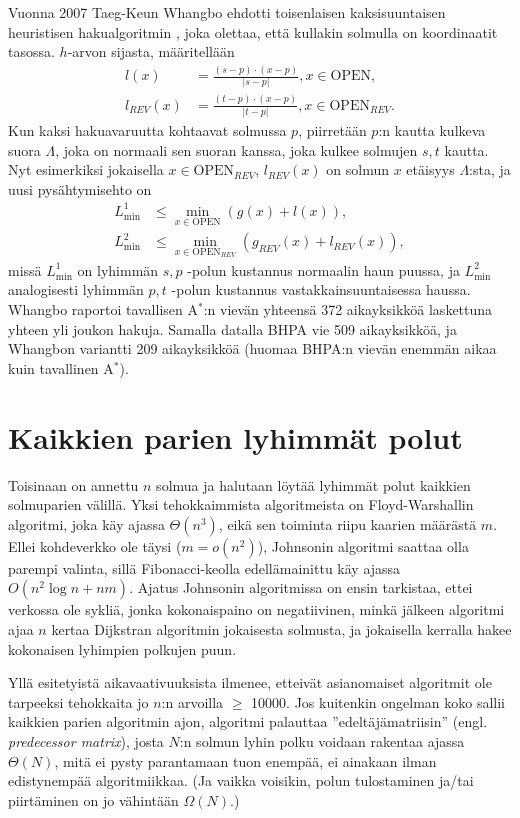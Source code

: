 \documentclass[finnish]{tktltiki2}
\theoremstyle{definition}
\theoremstyle{remark}
\begin{document}
Vuonna 2007 Taeg-Keun Whangbo ehdotti toisenlaisen kaksisuuntaisen heuristisen hakualgoritmin \cite{Whangbo07}, joka olettaa, että kullakin solmulla on koordinaatit tasossa. $h$-arvon sijasta, määritellään
\begin{align*}
l(x) &= \frac{(s - p) \cdot (x - p)}{ | s - p | }, x \in \text{OPEN}, \\
l_{REV}(x) &= \frac{(t - p) \cdot (x - p)}{ | t - p | }, x \in \text{OPEN}_{REV}.
\end{align*}
Kun kaksi hakuavaruutta kohtaavat solmussa $p$, piirretään $p$:n kautta kulkeva suora $\Lambda$, joka on normaali sen suoran kanssa, joka kulkee solmujen $s, t$ kautta. Nyt esimerkiksi jokaisella $x \in \text{OPEN}_{REV}$, $l_{REV}(x)$ on solmun $x$ etäisyys $\Lambda$:sta, ja uusi pysähtymisehto on
\begin{align*}
L^1_{\min} & \leq \underset{x \in \text{OPEN}}{\min} (g(x) + l(x)), \\
L^2_{\min} & \leq \underset{x \in \text{OPEN}_{REV}}{\min} (g_{REV}(x) + l_{REV}(x)),
\end{align*}
missä $L_{\min}^1$ on lyhimmän $s, p$ -polun kustannus normaalin haun puussa, ja $L_{\min}^2$ analogisesti lyhimmän $p, t$ -polun kustannus vastakkainsuuntaisessa haussa. Whangbo raportoi tavallisen A$^{\ast}$:n vievän yhteensä 372 aikayksikköä laskettuna yhteen yli joukon hakuja. Samalla datalla BHPA vie 509 aikayksikköä, ja Whangbon variantti 209 aikayksikköä (huomaa BHPA:n vievän enemmän aikaa kuin tavallinen A$^{\ast}$).

\section{Kaikkien parien lyhimmät polut}
Toisinaan on annettu $n$ solmua ja halutaan löytää lyhimmät polut kaikkien solmuparien välillä. Yksi tehokkaimmista algoritmeista on Floyd-Warshallin algoritmi, joka käy ajassa $\Theta(n^3)$, eikä sen toiminta riipu kaarien määrästä $m$. Ellei kohdeverkko ole täysi ($m = o(n^2)$), Johnsonin algoritmi saattaa olla parempi valinta, sillä Fibonacci-keolla edellämainittu käy ajassa $O(n^2 \log n + nm)$. Ajatus Johnsonin algoritmissa on ensin tarkistaa, ettei verkossa ole sykliä, jonka kokonaispaino on negatiivinen, minkä jälkeen algoritmi ajaa $n$ kertaa Dijkstran algoritmin jokaisesta solmusta, ja jokaisella kerralla hakee kokonaisen lyhimpien polkujen puun. 

Yllä esitetyistä aikavaativuuksista ilmenee, etteivät asianomaiset algoritmit ole tarpeeksi tehokkaita jo $n$:n arvoilla $\geq$ 10000. Jos kuitenkin ongelman koko sallii kaikkien parien algoritmin ajon, algoritmi palauttaa ''edeltäjämatriisin'' (engl. \textit{predecessor matrix}), josta $N$:n solmun lyhin polku voidaan rakentaa ajassa $\Theta(N)$, mitä ei pysty parantamaan tuon enempää, ei ainakaan ilman edistynempää algoritmiikkaa. (Ja vaikka voisikin, polun tulostaminen ja/tai piirtäminen on jo vähintään $\Omega(N)$.)
\end{document}

